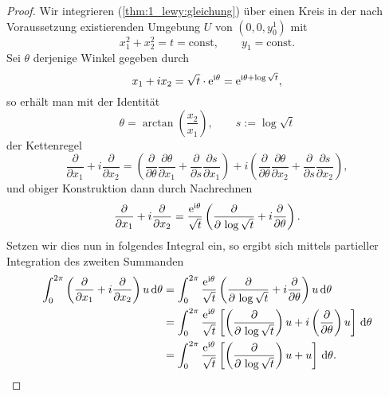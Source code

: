 \begin{proof}
Wir integrieren (\ref{thm:1_lewy:gleichung}) über einen Kreis in der nach Voraussetzung existierenden Umgebung $U$ von $(0,0,y_0^1)$ mit 
\begin{equation}
x_1^2+x_2^2=t=\mathrm{const},\qquad y_1=\mathrm{const}.
\end{equation}
Sei $\theta$ derjenige Winkel gegeben durch
\begin{equation}
x_1+ix_2=\sqrt{t}\cdot \mathrm e^{\mathrm i\theta} =\mathrm e^{\mathrm i\theta +\log\sqrt{t}},
\end{equation}
so erhält man mit der Identität
\begin{equation}
\theta=\arctan\left(\frac{x_2}{x_1}\right),\qquad s:=\log\sqrt{t}
\end{equation}
der Kettenregel 
\begin{equation}
\frac{\partial}{\partial x_1}+i\frac{\partial}{\partial x_2}
= \left(\frac{\partial}{\partial \theta} \frac{\partial\theta}{\partial x_1}+\frac{\partial}{\partial s}\frac{\partial s}{\partial x_1}\right)
+i \left(\frac{\partial}{\partial \theta} \frac{\partial\theta}{\partial x_2}+\frac{\partial}{\partial s}\frac{\partial s}{\partial x_2}\right),
\end{equation}
und obiger Konstruktion dann durch Nachrechnen
\begin{equation}\label{thm:1_lewy:proof1}
\frac{\partial}{\partial x_1} +i\frac{\partial}{\partial x_2}=\frac{\mathrm e^{\mathrm i\theta}}{\sqrt{t}} \left(\frac{\partial}{\partial \,\log \sqrt{t}}+i\frac{\partial}{\partial \theta}\right).
\end{equation}
Setzen wir dies nun in folgendes Integral ein, so ergibt sich mittels partieller Integration des zweiten Summanden
\begin{align}\label{thm:1_lewy:abl_gleich}
\begin{split}
\int_0^{2\pi} \left(\frac{\partial}{\partial x_1} +i\frac{\partial}{\partial x_2}\right)u\,\mathrm d\theta 
&= \int_0^{2\pi} \frac{\mathrm e^{\mathrm i\theta}}{\sqrt{t}} \left(\frac{\partial}{\partial \,\log \sqrt{t}}+i\frac{\partial}{\partial \theta}\right)u \,\mathrm d\theta \\
&= \int_0^{2\pi} \frac{\mathrm e^{\mathrm i\theta}}{\sqrt{t}} \left[ \left(\frac{\partial}{\partial \,\log \sqrt{t}}\right)u +i\left(\frac{\partial}{\partial \theta}\right)u\right]\,\mathrm d\theta \\
&= \int_0^{2\pi} \frac{\mathrm e^{\mathrm i\theta}}{\sqrt{t}} \left[ \left(\frac{\partial}{\partial \,\log \sqrt{t}}\right)u +u\right]\,\mathrm d\theta .
\end{split}
\end{align}

\end{proof}
